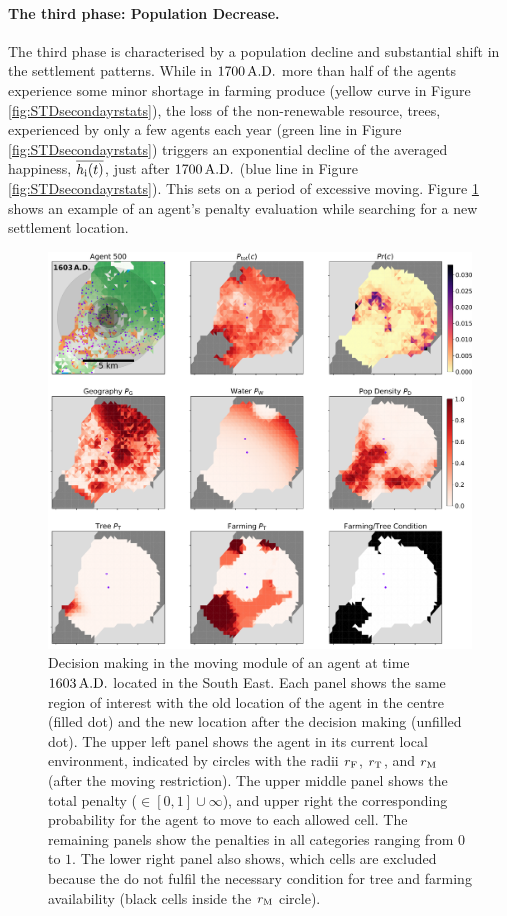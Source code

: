 \paragraph{The third phase: Population Decrease.}
The third phase is characterised by a population decline and substantial shift in the settlement patterns.
While in $1700\,{\rm A.D.}$ more than half of the agents experience some minor shortage in farming produce (yellow curve in Figure \ref{fig:STDsecondayrstats}), 
the loss of the non-renewable resource, trees, experienced by only a few agents each year (green line in Figure \ref{fig:STDsecondayrstats}) triggers an exponential decline of the averaged happiness, $\overline{h_{\rm i}(t)}$, just after $1700\, {\rm A.D.}$ (blue line in Figure \ref{fig:STDsecondayrstats}).
This sets on a period of excessive moving.
Figure \ref{fig:penaltiesag500t1603} shows an example of an agent's penalty evaluation while searching for a new settlement location.
\begin{figure}
	\centering
	\includegraphics[width=1.3\linewidth, center]{images/Results/Standard/Penalties_AG500_t=1603}
	\caption{Decision making in the moving module of an agent at time $1603\, {\rm A.D.}$ located in the South East. 
		Each panel shows the same region of interest with the old location of the agent in the centre (filled dot) and the new location after the decision making (unfilled dot).
		The upper left panel shows the agent in its current local environment, indicated by circles with the radii $r_{\rm F}$, $r_{\rm T}$, and $r_{\rm M}$ (after the moving restriction). The upper middle panel shows the total penalty ($\in [0,1]\cup \infty$), and upper right the corresponding probability for the agent to move to each allowed cell. The remaining panels show the penalties in all categories ranging from $0$ to $1$.
		The lower right panel also shows, which cells are excluded because the do not fulfil the necessary condition for tree and farming availability (black cells inside the $r_{\rm M}$ circle).}
	\label{fig:penaltiesag500t1603}
\end{figure}
